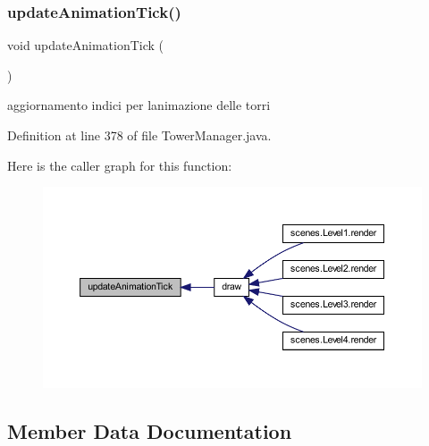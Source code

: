 \mbox{\label{classmanagers_1_1_tower_manager_a5c2bac0f4b9a3ef4e30f60d4b0c3b951}} 
\subsubsection{\texorpdfstring{update\+Animation\+Tick()}{updateAnimationTick()}}
{\footnotesize\ttfamily void update\+Animation\+Tick (\begin{DoxyParamCaption}{ }\end{DoxyParamCaption})\hspace{0.3cm}{\ttfamily [private]}}



aggiornamento indici per l\textquotesingle{}animazione delle torri 



Definition at line 378 of file Tower\+Manager.\+java.

Here is the caller graph for this function\+:
\nopagebreak
\begin{figure}[H]
\begin{center}
\leavevmode
\includegraphics[width=350pt]{classmanagers_1_1_tower_manager_a5c2bac0f4b9a3ef4e30f60d4b0c3b951_icgraph}
\end{center}
\end{figure}


\subsection{Member Data Documentation}
\mbox{\label{classmanagers_1_1_tower_manager_a04d62de5f8367e549268b6c5540e1e97}} 

